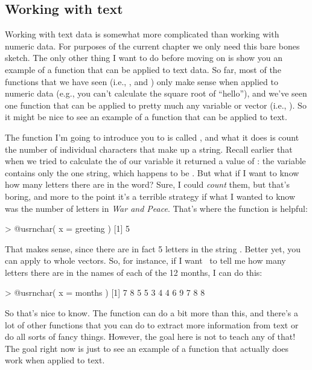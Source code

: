 \subsection*{Working with text~\label{sec:simpletext}}

Working with text data is somewhat more complicated than working with numeric data. For purposes of the current chapter we only need this bare bones sketch. The only other thing I want to do before moving on is show you an example of a function that can be applied to text data. So far, most of the functions that we have seen (i.e., ,  and ) only make sense when applied to numeric data (e.g., you can't calculate the square root of ``hello''), and we've seen one function that can be applied to pretty much any variable or vector (i.e., ). So it might be nice to see an example of a function that can be applied to text. 

The function I'm going to introduce you to is called , and what it does is count the number of individual characters that make up a string. Recall earlier that when we tried to calculate the  of our  variable it returned a value of : the  variable contains only the one string, which happens to be . But what if I want to know how many letters there are in the word? Sure, I could {\it count} them, but that's boring, and more to the point it's a terrible strategy if what I wanted to know was the number of letters in {\it War and Peace}. That's where the  function is helpful:
\begin{rblock1}
> @usr{nchar( x = greeting )}
[1] 5
\end{rblock1}
That makes sense, since there are in fact 5 letters in the string . Better yet, you can apply  to whole vectors. So, for instance, if I want \R\ to tell me how many letters there are in the names of each of the 12 months, I can do this:
\begin{rblock1}
> @usr{nchar( x = months )}
 [1] 7 8 5 5 3 4 4 6 9 7 8 8
\end{rblock1}
So that's nice to know. The  function can do a bit more than this, and there's a lot of other functions that you can do to extract more information from text or do all sorts of fancy things. However, the goal here is not to teach any of that! The goal right now is just to see an example of a function that actually does work when applied to text. 


